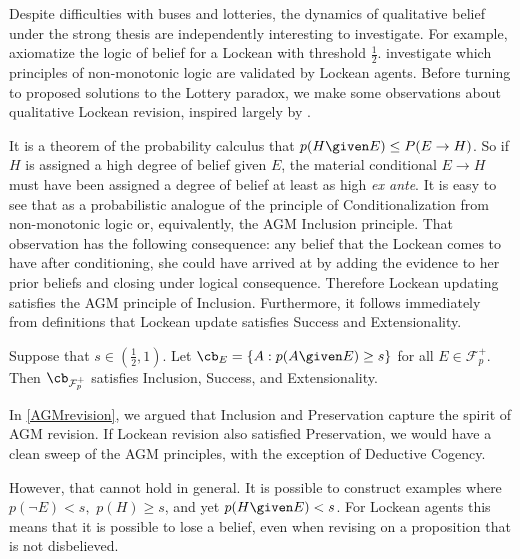 Despite difficulties with buses and lotteries, the dynamics of qualitative
belief under the strong thesis are independently interesting to investigate. For
example, \citet{vaneijck2014bet} axiomatize the logic of belief for a Lockean
with threshold $\frac{1}{2}$. \citet{makinson2015lossy} investigate which
principles of non-monotonic logic are validated by Lockean agents. Before
turning to proposed solutions to the Lottery paradox, we make some observations
about qualitative Lockean revision,  inspired largely by \citet{shear2018two}.

It is a theorem of the probability calculus that $p(H \given E) \leq
P(E\rightarrow H)$. So if $H$ is assigned a high degree of belief given $E$, the
material conditional $E\rightarrow H$ must have been assigned a degree of belief
at least as high {\em ex ante}. It is easy to see that as a probabilistic
analogue of the principle of Conditionalization from non-monotonic logic or,
equivalently, the AGM Inclusion principle. That observation has the following
consequence: any belief that the Lockean comes to have after conditioning, she
could have arrived at by adding the evidence to her prior beliefs and closing
under logical consequence. Therefore Lockean updating satisfies the AGM
principle of Inclusion. Furthermore, it follows immediately from definitions
that Lockean update satisfies Success and Extensionality.
\begin{theorem}
Suppose that $s\in (\frac{1}{2}, 1)$. Let $\cb_E = \{ A : p(A \given E) \geq
s\}$ for all $E\in\mathcal{F}_p^+$. Then $\cb_{\mathcal{F}_p^+}$ satisfies
Inclusion, Success, and Extensionality.  
\end{theorem}
In \autoref{AGMrevision}, we argued that Inclusion and Preservation capture the
spirit of AGM revision. If Lockean revision also satisfied Preservation, we
would have a clean sweep of the AGM principles, with the exception of Deductive
Cogency.

However, that cannot hold in general. It is possible to construct examples where
$p(\neg E) < s,$ $p(H)\geq s$, and yet $p(H \given E)<s$. For Lockean agents
this means that it is possible to lose a belief, even when revising on a
proposition that is not disbelieved.

